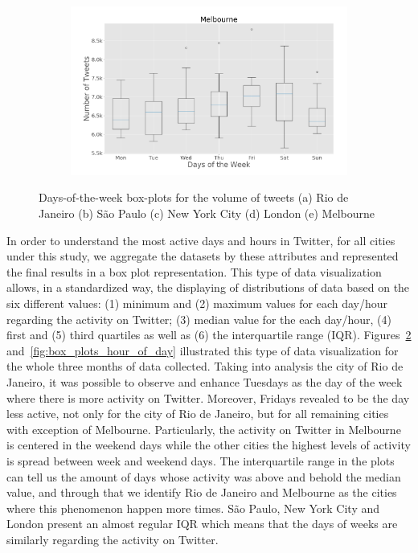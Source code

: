 \begin{figure}[htbp]
     \begin{subfigure}[htbp]{0.45\textwidth}
        \centering
        \includegraphics[width=1\linewidth]{figures/melbourne_box_plt_day_of_week.png}
        \caption{}
        \label{subfig:melbourne_box_plot_day_of_week}
    \end{subfigure}
    
\caption[Five numerical solutions]{Days-of-the-week box-plots for the volume of tweets (a) Rio de Janeiro (b) São Paulo (c) New York City (d) London (e) Melbourne}
\label{fig:box_plots_day_of_week}
\end{figure}

In order to understand the most active days and hours in Twitter, for all cities under this study, we aggregate the datasets by these attributes and represented the final results in a box plot representation. This type of data visualization allows, in a standardized way, the displaying of distributions of data based on the six different values: (1) minimum and (2) maximum values for each day/hour regarding the activity on Twitter; (3) median value for the each day/hour, (4) first and (5) third quartiles as well as (6) the interquartile range (IQR). Figures~\ref{fig:box_plots_day_of_week} and~\ref{fig:box_plots_hour_of_day} illustrated this type of data visualization for the whole three months of data collected. Taking into analysis the city of Rio de Janeiro, it was possible to observe and enhance Tuesdays as the day of the week where there is more activity on Twitter. Moreover, Fridays revealed to be the day less active, not only for the city of Rio de Janeiro, but for all remaining cities with exception of Melbourne. Particularly, the activity on Twitter in Melbourne is centered in the weekend days while the other cities the highest levels of activity is spread between week and weekend days. The interquartile range in the plots can tell us the amount of days whose activity was above and behold the median value, and through that we identify Rio de Janeiro and Melbourne as the cities where this phenomenon happen more times. São Paulo, New York City and London present an almost regular IQR which means that the days of weeks are similarly regarding the activity on Twitter.

